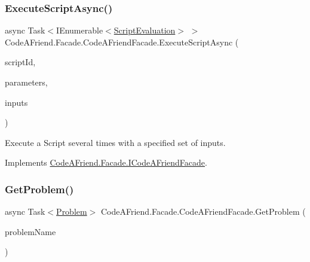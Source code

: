 \subsubsection{\texorpdfstring{Execute\+Script\+Async()}{ExecuteScriptAsync()}\hspace{0.1cm}{\footnotesize\ttfamily [2/2]}}
{\footnotesize\ttfamily async Task$<$I\+Enumerable$<$\mbox{\hyperlink{class_code_a_friend_1_1_data_model_1_1_script_evaluation}{Script\+Evaluation}}$>$ $>$ Code\+A\+Friend.\+Facade.\+Code\+A\+Friend\+Facade.\+Execute\+Script\+Async (\begin{DoxyParamCaption}\item[{Guid}]{script\+Id,  }\item[{\mbox{\hyperlink{class_code_a_friend_1_1_data_model_1_1_execution_parameters}{Execution\+Parameters}}}]{parameters,  }\item[{params string \mbox{[}$\,$\mbox{]}}]{inputs }\end{DoxyParamCaption})}



Execute a Script several times with a specified set of inputs. 



Implements \mbox{\hyperlink{interface_code_a_friend_1_1_facade_1_1_i_code_a_friend_facade_a7a3f1a746d41872d14197a8949781ce2}{Code\+A\+Friend.\+Facade.\+I\+Code\+A\+Friend\+Facade}}.

\mbox{\label{class_code_a_friend_1_1_facade_1_1_code_a_friend_facade_a0fd5153f295a66388ef6a6d4880f32bd}} 
\subsubsection{\texorpdfstring{Get\+Problem()}{GetProblem()}}
{\footnotesize\ttfamily async Task$<$\mbox{\hyperlink{class_code_a_friend_1_1_data_model_1_1_problem}{Problem}}$>$ Code\+A\+Friend.\+Facade.\+Code\+A\+Friend\+Facade.\+Get\+Problem (\begin{DoxyParamCaption}\item[{string}]{problem\+Name }\end{DoxyParamCaption})}



